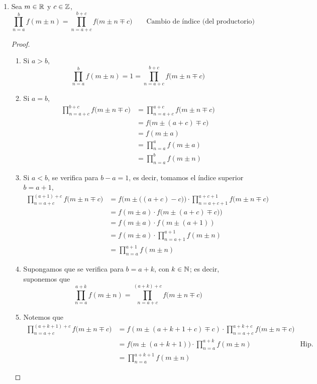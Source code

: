 \begin{enumerate}[label=\alph*)]
    \item Sea $m\in \mathbb{R}$ y $c\in \mathbb{Z}$, \[\prod_{n=a}^{b} f(m\pm n) = \prod_{n=a+c}^{b+c} f\big(m\pm n \mp c\big) \qquad \text{Cambio de índice (del productorio)}\]
    \begin{proof}\leavevmode
      \begin{enumerate}[label=\Roman*)]
        \item Si $a>b$, \[\prod_{n=a}^{b} f(m\pm n) = 1 = \prod_{n=a+c}^{b+c} f\big(m\pm n \mp c\big)\]
        \item Si $a=b$, 
        \begin{align*}
          \prod_{n=a+c}^{b+c} f\big(m\pm n \mp c\big) &= \prod_{n=a+c}^{a+c} f\big(m\pm n \mp c\big)\\
          &= f\Big(m\pm (a+c) \mp c\Big)\\
          &= f(m\pm a)\\
          &= \prod_{n=a}^{a} f(m\pm a)\\
          &= \prod_{n=a}^{b} f(m\pm n)
        \end{align*}
        \item Si $a<b$, se verifica para $b-a=1$, es decir, tomamos el índice superior $b=a+1$,
        \begin{align*}
          \prod_{n=a+c}^{(a+1)+c} f\big(m\pm n \mp c\big) &= f\Big(m\pm \big((a+c)-c\big)\Big) \cdot \prod_{n=a+c+1}^{a+c+1} f\big(m\pm n \mp c\big)\\
          &= f(m\pm a) \cdot f\Big(m\pm (a+c) \mp c)\Big)\\
          &= f(m\pm a) \cdot f(m\pm (a+1))\\
          &= f(m\pm a) \cdot \prod_{n=a+1}^{a+1} f(m \pm n)\\
          &= \prod_{n=a}^{a+1} f(m\pm n)
        \end{align*}
        \item Supongamos que se verifica para $b=a+k$, con $k\in \mathbb{N}$; es decir, suponemos que \[\prod_{n=a}^{a+k} f(m\pm n) = \prod_{n=a+c}^{(a+k)+c} f\big(m\pm n \mp c\big)\]
        \item Notemos que
        \begin{align*}
          \prod_{n=a+c}^{(a+k+1)+c} f\big(m\pm n \mp c\big) &= f(m\pm (a+k+1+c) \mp c) \cdot \prod_{n=a+c}^{a+k+c} f\big(m\pm n \mp c\big)\\
          &= f\big(m \pm (a+k+1)\big) \cdot \prod_{n=a}^{a+k} f(m \pm n) & \text{Hip. Ind.}\\
          &= \prod_{n=a}^{a+k+1} f(m\pm n)
        \end{align*}
      \end{enumerate}
    \end{proof}
    

\end{enumerate}

